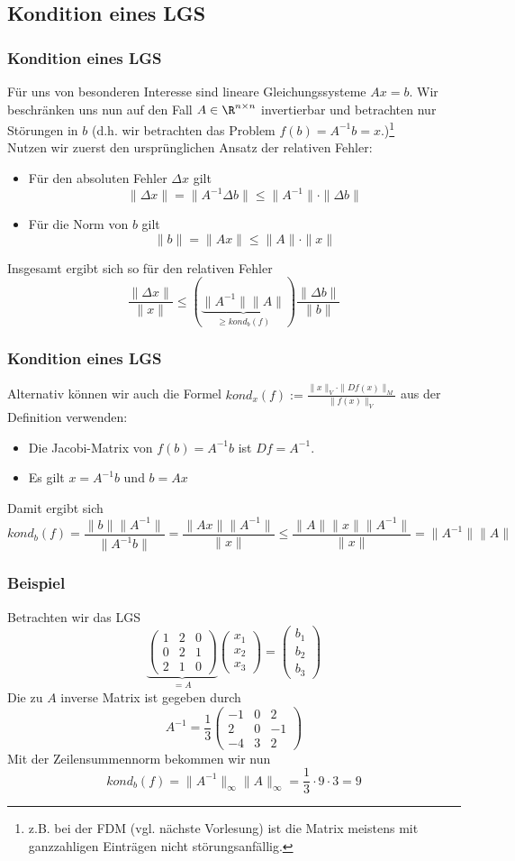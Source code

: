 \subsection{Kondition eines LGS}
%
\begin{frame}\frametitle{Kondition eines LGS}
Für uns von besonderen Interesse sind lineare Gleichungssysteme $Ax=b$. Wir beschränken uns nun auf den Fall $A \in \R^{n\times n}$ invertierbar und betrachten nur Störungen in $b$ (d.h. wir betrachten das Problem $f(b)=A^{-1}b=x$.)\footnote{z.B. bei der FDM (vgl. nächste Vorlesung) ist die Matrix meistens mit ganzzahligen Einträgen nicht störungsanfällig.}\\
Nutzen wir zuerst den ursprünglichen Ansatz der relativen Fehler:\pause\\\vfill
\begin{itemize}
\item Für den absoluten Fehler $\Delta x$ gilt
$$
\|\Delta x\|=\|A^{-1}\Delta b\| \le \|A^{-1}\|\cdot \|\Delta b\|
$$
\item Für die Norm von $b$ gilt
$$
\|b\|=\|Ax\|\le \|A\|\cdot \|x\|
$$
\end{itemize}
Insgesamt ergibt sich so für den relativen Fehler
$$
\frac{\|\Delta x\|}{\|x\|} \le (\underbrace{\|A^{-1}\|\|A\|}_{\ge kond_b(f)})\frac{\|\Delta b\|}{\|b\|}
$$
\end{frame}
%
%
\begin{frame}\frametitle{Kondition eines LGS}
Alternativ können wir auch die Formel $kond_x(f):=\frac{\|x\|_V\cdot \|Df(x)\|_M}{\|f(x)\|_V}$ aus der Definition verwenden:\\
\vfill
\begin{itemize}
\item Die Jacobi-Matrix von $f(b)=A^{-1}b$ ist $Df=A^{-1}$.
\item Es gilt $x=A^{-1}b$ und $b=Ax$
\end{itemize}
\vfill
Damit ergibt sich
$$
kond_b(f)= \frac{\|b\|\|A^{-1}\|}{\|A^{-1}b\|}=\frac{\|Ax\|\|A^{-1}\|}{\|x\|}\le \frac{\|A\|\|x\|\|A^{-1}\|}{\|x\|}=\|A^{-1}\|\|A\|
$$
\end{frame}
%
%
\begin{frame}\frametitle{Beispiel}
Betrachten wir das LGS
$$
\underbrace{\begin{pmatrix}1&2&0\\0&2&1\\2&1&0\end{pmatrix}}_{=A}\begin{pmatrix}x_1\\x_2\\x_3\end{pmatrix}=\begin{pmatrix}b_1\\b_2\\b_3\end{pmatrix}
$$
Die zu $A$ inverse Matrix ist gegeben durch
$$
A^{-1}=\frac{1}{3}\begin{pmatrix}-1&0&2\\2&0&-1\\-4&3&2\end{pmatrix}
$$	
Mit der Zeilensummennorm bekommen wir nun
$$
kond_b(f)=\|A^{-1}\|_\infty\|A\|_\infty=\frac{1}{3}\cdot 9\cdot 3=9
$$
\end{frame}
%

